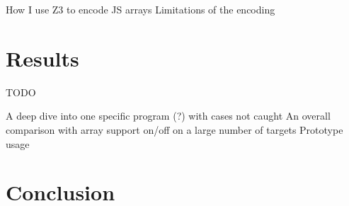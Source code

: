 \documentclass[]{final_report}
\begin{document}
How I use Z3 to encode JS arrays
Limitations of the encoding

\section{Results}

TODO

A deep dive into one specific program (?) with cases not caught
An overall comparison with array support on/off on a large number of targets
Prototype usage

\section{Conclusion}

\newpage


\label{endpage}
\end{document}
